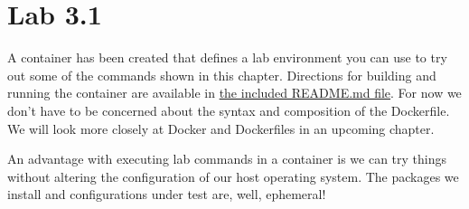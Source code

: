 \section{Lab 3.1}

\justify{}
A container has been created that defines a lab environment you can use to try out some of the commands shown
in this chapter. Directions for building and running the container are available in 
\href{https://github.com/devsecfranklin/devsecops-tactical-workbook/tree/main/code/chapter-three}{the included README.md file}.
For now we don't have to be concerned about the syntax and composition of the Dockerfile. We will look more closely
at Docker and Dockerfiles in an upcoming chapter.

\justify{}
An advantage with executing lab commands in a container is we can try things without altering the configuration of
our host operating system. The packages we install and configurations under test are, well, ephemeral!
